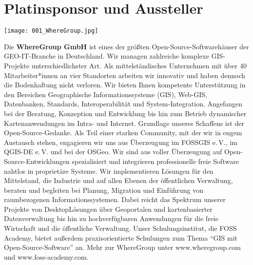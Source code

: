 \cleardoubleevenpage
\section*{Platinsponsor und Aussteller}
\begin{center}
  \centerline{\texttt{[image: 001\_WhereGroup.jpg]}}
\end{center}
\vspace*{-0.4cm}

\noindent
Die {\bfseries WhereGroup GmbH} ist eines der größten Open-Source-Soft\-ware\-häuser der GEO-IT-Branche in Deutschland. Wir managen zahlreiche komplexe GIS-Projekte unterschiedlichster Art. Als mittelständisches Unternehmen mit über 40 Mitarbeiter*innen an vier Standorten arbeiten wir innovativ und haben dennoch die Bodenhaftung nicht verloren.
\noindent
Wir bieten Ihnen kompetente Unterstützung in den Bereichen Geographische Informationssysteme (GIS), Web-GIS, Datenbanken, Standards, Interoperabilität und System-Integration. Angefangen bei der Beratung, Konzeption und Entwicklung bis hin zum Betrieb dynamischer Kartenanwendungen im Intra- und Internet.
\noindent
Grundlage unseres Schaffens ist der Open-Source-Gedanke. Als Teil einer starken Community, mit der wir in engem Austausch stehen, engagieren wir uns aus Überzeugung im FOSSGIS e.\,V., im QGIS-DE e.\,V. und bei der OSGeo. Wir sind aus voller Überzeugung auf Open-Source-Entwicklungen spezialisiert und integrieren professionelle freie Software nahtlos in proprietäre Systeme.
\noindent
Wir implementieren Lösungen für den Mittelstand, die Industrie und auf allen Ebenen der öffentlichen Verwaltung, beraten und begleiten bei Planung, Migration und Einführung von raumbezogenen Informationssystemen.
\noindent
Dabei reicht das Spektrum unserer Projekte von Desktop\-Lösungen über Geoportalen und kartenbasierter Datenverwaltung bis hin zu hochverfügbaren Anwendungen für die freie Wirtschaft und die öffentliche Verwaltung.
\noindent
Unser Schulungsinstitut, die FOSS Academy, bietet außerdem praxisorientierte Schulungen zum Thema "`GIS mit Open-Source-Software"' an.
\noindent
Mehr zur WhereGroup unter www.wheregroup.com und www.foss-academy.com.

